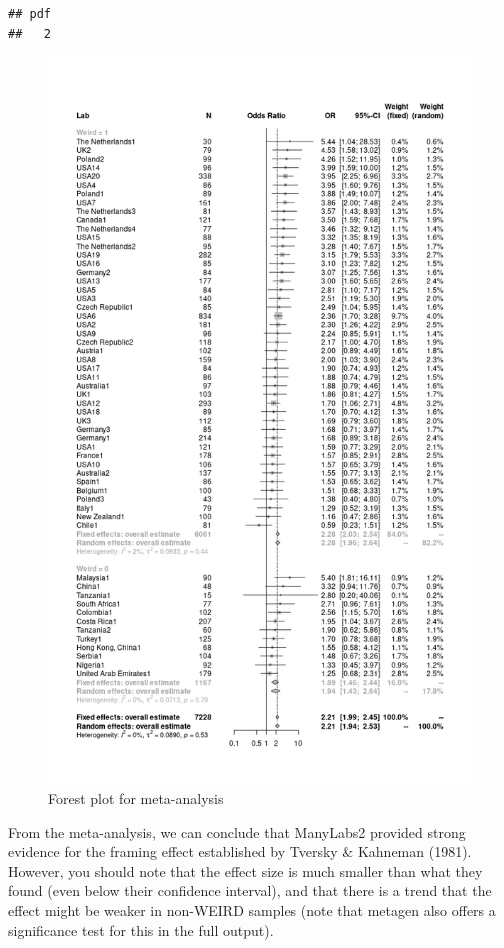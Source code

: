 \documentclass[
]{book}
\begin{document}
\begin{verbatim}
## pdf 
##   2
\end{verbatim}

\begin{figure}

{\centering \includegraphics[width=1\linewidth]{./images/forest} 

}

\caption{Forest plot for meta-analysis}\label{fig:img-forest}
\end{figure}

From the meta-analysis, we can conclude that ManyLabs2 provided strong evidence for the framing effect established by Tversky \& Kahneman (1981). However, you should note that the effect size is much smaller than what they found (even below their confidence interval), and that there is a trend that the effect might be weaker in non-WEIRD samples (note that metagen also offers a significance test for this in the full output).
\end{document}
